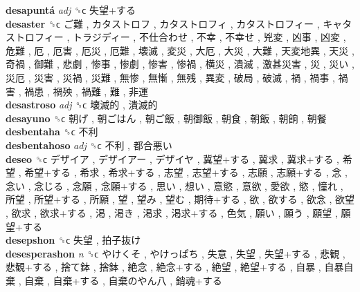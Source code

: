 \textbf{desapuntá} \emph{adj}  ␝ϲ   失望+する   \\
\textbf{desaster} ␝ϲ   ご難 ,  カタストロフ ,  カタストロフィ ,  カタストロフィー ,  キャタストロフィー ,  トラジディー ,  不仕合わせ ,  不幸 ,  不幸せ ,  兇変 ,  凶事 ,  凶変 ,  危難 ,  厄 ,  厄害 ,  厄災 ,  厄難 ,  壊滅 ,  変災 ,  大厄 ,  大災 ,  大難 ,  天変地異 ,  天災 ,  奇禍 ,  御難 ,  悲劇 ,  惨事 ,  惨劇 ,  惨害 ,  惨禍 ,  横災 ,  潰滅 ,  激甚災害 ,  災 ,  災い ,  災厄 ,  災害 ,  災禍 ,  災難 ,  無惨 ,  無慚 ,  無残 ,  異変 ,  破局 ,  破滅 ,  禍 ,  禍事 ,  禍害 ,  禍患 ,  禍殃 ,  禍難 ,  難 ,  非運   \\
\textbf{desastroso} \emph{adj}  ␝ϲ   壊滅的 ,  潰滅的   \\
\textbf{desayuno} ␝ϲ   朝げ ,  朝ごはん ,  朝ご飯 ,  朝御飯 ,  朝食 ,  朝飯 ,  朝餉 ,  朝餐   \\
\textbf{desbentaha} ␝ϲ   不利   \\
\textbf{desbentahoso} \emph{adj}  ␝ϲ   不利 ,  都合悪い   \\
\textbf{deseo} ␝ϲ   デザイア ,  デザイアー ,  デザイヤ ,  冀望+する ,  冀求 ,  冀求+する ,  希望 ,  希望+する ,  希求 ,  希求+する ,  志望 ,  志望+する ,  志願 ,  志願+する ,  念 ,  念い ,  念じる ,  念願 ,  念願+する ,  思い ,  想い ,  意慾 ,  意欲 ,  愛欲 ,  慾 ,  憧れ ,  所望 ,  所望+する ,  所願 ,  望 ,  望み ,  望む ,  期待+する ,  欲 ,  欲する ,  欲念 ,  欲望 ,  欲求 ,  欲求+する ,  渇 ,  渇き ,  渇求 ,  渇求+する ,  色気 ,  願い ,  願う ,  願望 ,  願望+する   \\
\textbf{desepshon} ␝ϲ   失望 ,  拍子抜け   \\
\textbf{desesperashon} \emph{n}  ␝ϲ   やけくそ ,  やけっぱち ,  失意 ,  失望 ,  失望+する ,  悲観 ,  悲観+する ,  捨て鉢 ,  捨鉢 ,  絶念 ,  絶念+する ,  絶望 ,  絶望+する ,  自暴 ,  自暴自棄 ,  自棄 ,  自棄+する ,  自棄のやん八 ,  銷魂+する   \\
